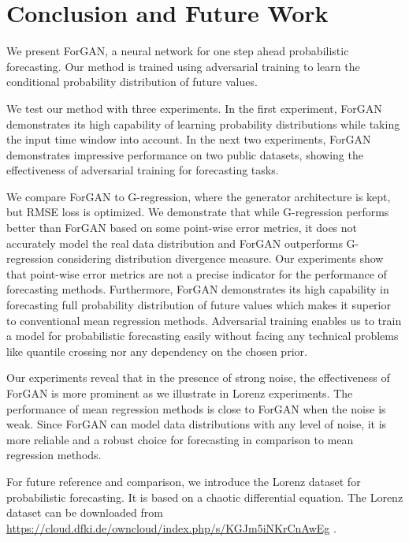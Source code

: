 \documentclass{ieeeaccess}
\begin{document}
\section{Conclusion and Future Work}
\label{sec:conclusion}
We present ForGAN, a neural network for one step ahead probabilistic forecasting. Our method is trained using adversarial training to learn the conditional probability distribution of future values.

We test our method with three experiments. In the first experiment, ForGAN demonstrates its high capability of learning probability distributions while taking the input time window into account. In the next two experiments, ForGAN demonstrates impressive performance on two public datasets, showing the effectiveness of adversarial training for forecasting tasks.

We compare ForGAN to G-regression, where the generator architecture is kept, but RMSE loss is optimized. We demonstrate that while G-regression performs better than ForGAN based on some point-wise error metrics, it does not accurately model the real data distribution and ForGAN outperforms G-regression considering distribution divergence measure. Our experiments show that point-wise error metrics are not a precise indicator for the performance of forecasting methods. Furthermore, ForGAN demonstrates its high capability in forecasting full probability distribution of future values which makes it superior to conventional mean regression methods. Adversarial training enables us to train a model for probabilistic forecasting easily without facing any technical problems like quantile crossing nor any dependency on the chosen prior.

Our experiments reveal that in the presence of strong noise, the effectiveness of ForGAN is more prominent as we illustrate in Lorenz experiments. The performance of mean regression methods is close to ForGAN when the noise is weak. Since ForGAN can model data distributions with any level of noise, it is more reliable and a robust choice for forecasting in comparison to mean regression methods.

For future reference and comparison, we introduce the Lorenz dataset for probabilistic forecasting. It is based on a chaotic differential equation. The Lorenz dataset can be downloaded from \underline{https://cloud.dfki.de/owncloud/index.php/}\break\underline{s/KGJm5iNKrCnAwEg} .
\end{document}
